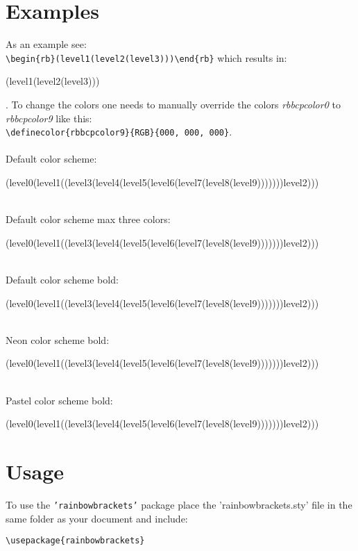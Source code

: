 \documentclass[10pt, a4paper]{article}
\begin{document}
	\section{Examples}
	As an example see: \\\verb=\begin{rb}(level1(level2(level3)))\end{rb}= which results in: \begin{rb}(level1(level2(level3)))\end{rb}.
	To change the colors one needs to manually override the colors \textit{rbbcpcolor0} to \textit{rbbcpcolor9} like this: \\\verb=\definecolor{rbbcpcolor9}{RGB}{000, 000, 000}=.
	\\\ \\Default color scheme: \\\begin{rb}(level0(level1((level3(level4(level5(level6(level7(level8(level9)))))))level2)))\end{rb}
	\\Default color scheme max three colors: \\\begin{rb}(level0(level1((level3(level4(level5(level6(level7(level8(level9)))))))level2)))\end{rb}
	\resetrainbowbracketmax
	\\Default color scheme bold: 
	\\\begin{rB}(level0(level1((level3(level4(level5(level6(level7(level8(level9)))))))level2)))\end{rB}
	\setrbstyleneon
	\\Neon color scheme bold: 
	\\\begin{rB}(level0(level1((level3(level4(level5(level6(level7(level8(level9)))))))level2)))\end{rB}
	\setrbstylepastel
	\\Pastel color scheme bold: 
	\\\begin{rB}(level0(level1((level3(level4(level5(level6(level7(level8(level9)))))))level2)))\end{rB}
	\resetrbstyle
	\section{Usage}
	To use the \texttt{'rainbowbrackets'} package place the 'rainbowbrackets.sty' file in the same folder as your document and include:
	\begin{lstlisting}[style=A]
			\usepackage{rainbowbrackets}
	\end{lstlisting}
\end{document}
